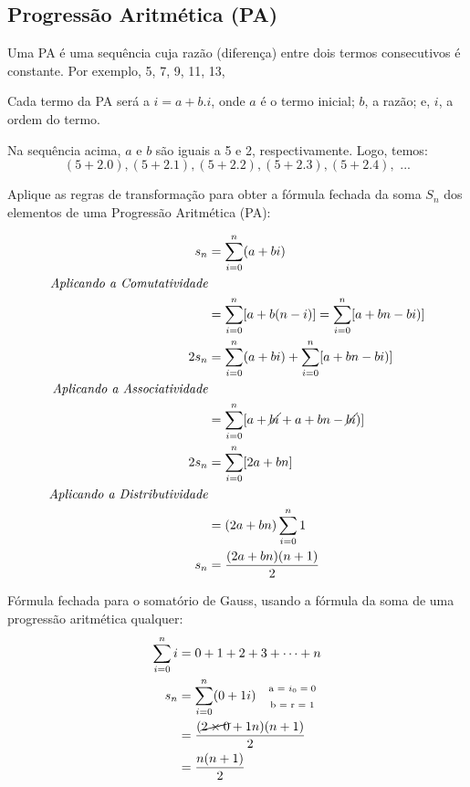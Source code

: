 \documentclass{article}
\begin{document}
\subsection{Progressão Aritmética (PA)}
Uma PA é uma sequência cuja razão (diferença) entre dois termos
consecutivos é constante. Por exemplo, 5, 7, 9, 11, 13,

Cada termo da PA será a $i = a + b.i$, onde $a$ é o termo inicial; $b$, a razão; e, $i$, a ordem do termo.

Na sequência acima, $a$ e $b$ são iguais a 5 e 2, respectivamente. Logo, temos:
\begin{equation}
    (5 + 2.0), (5 + 2.1), (5 + 2.2), (5 + 2.3), (5 + 2.4), \,\, ...
\end{equation}

Aplique as regras de transformação para obter a fórmula fechada da soma $S_n$ dos
elementos de uma Progressão Aritmética (PA):

\begin{equation}
    \begin{aligned}
        s_n &= \sum_{i=0}^{n} (a + bi) \\
        \textit{Aplicando a Comutatividade}\\
            &= \sum_{i=0}^{n} [a + b(n-i)] = \sum_{i=0}^{n} [a + bn - bi)] \\ 
        2s_n&= \sum_{i=0}^{n} (a + bi) + \sum_{i=0}^{n} [a + bn - bi)] \\
        \textit{Aplicando a Associatividade}\\
            &= \sum_{i=0}^{n} [a + \cancel{bi} + a + bn - \cancel{bi})] \\
        2s_n&= \sum_{i=0}^{n} [2a + bn] \\
        \textit{Aplicando a Distributividade}\\
            &= (2a + bn) \sum_{i=0}^{n} 1 \\
        s_n &= \frac{(2a + bn) (n+1)}{2}
    \end{aligned}
\end{equation}

Fórmula fechada para o somatório de Gauss, usando a fórmula da soma de uma progressão aritmética qualquer:
\begin{equation}
    \begin{aligned}
        \sum_{i=0}^{n} i &= 0 + 1 + 2 + 3 + \dots + n \\   
        s_n &= \sum_{i=0}^{n} (0 + 1i) \quad  \overset{\text{a = $i_0 = 0$}}{\underset{\text{b = r = 1}}{\phantom{a}}}\\
            &= \frac{(\cancel{2\times0} + 1n)(n+1)}{2} \\
            &= \frac{n (n+1)}{2}
    \end{aligned}
\end{equation}
\end{document}
